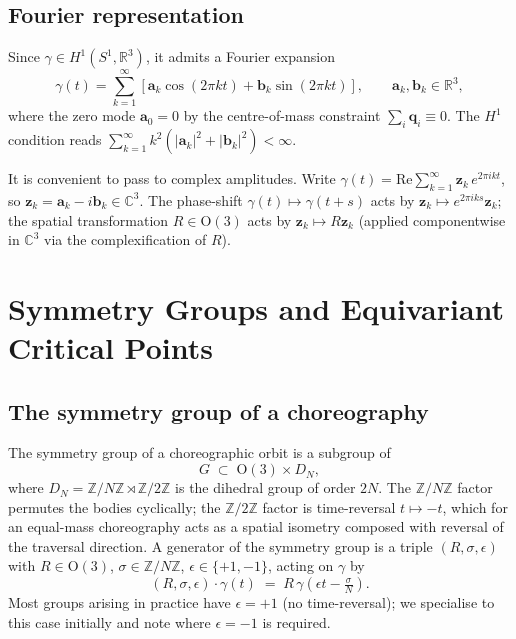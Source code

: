 \documentclass[12pt, a4paper]{article}
\theoremstyle{plain}
\theoremstyle{definition}
\newcommand{\R}{\mathbb{R}}
\newcommand{\C}{\mathbb{C}}
\newcommand{\Z}{\mathbb{Z}}
\newcommand{\bfq}{\mathbf{q}}
\newcommand{\bfa}{\mathbf{a}}
\newcommand{\bfb}{\mathbf{b}}
\newcommand{\bfz}{\mathbf{z}}
\newcommand{\On}{\mathrm{O}}
\newcommand{\abs}[1]{\left|#1\right|}
\begin{document}
\subsection{Fourier representation}

Since $\gamma \in H^1(S^1,\R^3)$, it admits a Fourier expansion
\begin{equation}\label{eq:fourier}
  \gamma(t)
  = \sum_{k=1}^{\infty}
    \left[\bfa_k \cos(2\pi k t) + \bfb_k \sin(2\pi k t)\right],
  \qquad \bfa_k, \bfb_k \in \R^3,
\end{equation}
where the zero mode $\bfa_0 = 0$ by the centre-of-mass constraint
$\sum_i \bfq_i \equiv 0$.  The $H^1$ condition reads
$\sum_{k=1}^\infty k^2(\abs{\bfa_k}^2 + \abs{\bfb_k}^2) < \infty$.

It is convenient to pass to complex amplitudes.  Write
$\gamma(t) = \mathrm{Re}\sum_{k=1}^\infty \bfz_k\,e^{2\pi ikt}$, so
$\bfz_k = \bfa_k - i\bfb_k \in \C^3$.  The phase-shift
$\gamma(t) \mapsto \gamma(t + s)$ acts by $\bfz_k \mapsto
e^{2\pi iks}\bfz_k$; the spatial transformation $R \in \On(3)$ acts by
$\bfz_k \mapsto R\bfz_k$ (applied componentwise in $\C^3$ via the
complexification of $R$).

\section{Symmetry Groups and Equivariant Critical Points}

\subsection{The symmetry group of a choreography}

The symmetry group of a choreographic orbit is a subgroup of
\[
  G \;\subset\; \On(3) \times D_N,
\]
where $D_N = \Z/N\Z \rtimes \Z/2\Z$ is the dihedral group of order $2N$.
The $\Z/N\Z$ factor permutes the bodies cyclically; the $\Z/2\Z$ factor
is time-reversal $t \mapsto -t$, which for an equal-mass choreography
acts as a spatial isometry composed with reversal of the traversal
direction.  A generator of the symmetry group is a triple
$(R, \sigma, \epsilon)$ with $R \in \On(3)$, $\sigma \in \Z/N\Z$,
$\epsilon \in \{+1,-1\}$, acting on $\gamma$ by
\begin{equation}\label{eq:gaction}
  (R,\sigma,\epsilon)\cdot\gamma(t)
  \;=\;
  R\,\gamma\!\left(\epsilon t - \tfrac{\sigma}{N}\right).
\end{equation}
Most groups arising in practice have $\epsilon = +1$ (no time-reversal);
we specialise to this case initially and note where $\epsilon = -1$ is
required.
\end{document}
